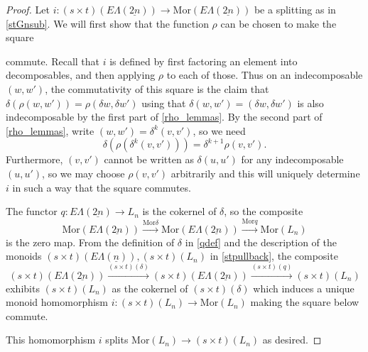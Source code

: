 \documentclass{amsbook} %
\newcommand{\ELn}{E\Lambda(\underline{n})}
\newcommand{\ELnn}{E\Lambda(\underline{2n})}
\numberwithin{section}{chapter}
\begin{document}
\begin{proof}
Let $i:(s \times t)(\ELnn) \to \mathrm{Mor}(\ELnn)$ be a splitting as in \cref{stGnsub}. We will first show that the function $\rho$ can be chosen to make the square
\begin{center}
\end{center}
commute. Recall that $i$ is defined by first factoring an element into decomposables, and then applying $\rho$ to each of those. Thus on an indecomposable $(w,w')$, the commutativity of this square is the claim that $\delta(\rho(w,w')) = \rho(\delta w, \delta w')$ using that $\delta(w,w') = (\delta w, \delta w')$ is also indecomposable by the first part of \cref{rho_lemmas}. By the second part of \cref{rho_lemmas}, write $(w,w') = \delta^k(v,v')$, so we need
\[
\delta(\rho(\delta^k(v,v'))) = \delta^{k+1}\rho(v,v').
\]
Furthermore, $(v,v')$ cannot be written as $\delta(u,u')$ for any indecomposable $(u,u')$, so we may choose $\rho(v,v')$ arbitrarily and this will uniquely determine $i$ in such a way that the square commutes. 

The functor $q:\ELnn \to L_n$ is the cokernel of $\delta$, so the composite
\[
\mathrm{Mor}(\ELnn) \stackrel{\mathrm{Mor}\delta}{\longrightarrow} \mathrm{Mor}(\ELnn) \stackrel{\mathrm{Mor}q}{\longrightarrow} \mathrm{Mor}(L_n)
\]
is the zero map. From the definition of $\delta$ in \cref{qdef} and the description of the monoids $(s \times t)(\ELn), (s \times t)(L_n)$ in \cref{stpullback}, the composite
\[
(s \times t)(\ELnn) \stackrel{(s \times t)(\delta)}{\longrightarrow}  (s \times t)(\ELnn) \stackrel{(s \times t)(q)}{\longrightarrow} (s \times t)(L_n)
\]
exhibits $(s \times t)(L_n)$ as the cokernel of $(s \times t)(\delta)$ which induces a unique monoid homomorphism $i: (s \times t)(L_n) \to \mathrm{Mor}(L_n)$ making the square below commute.
\begin{center}
\end{center}
This homomorphism $i$ splits $\mathrm{Mor}(L_n) \to (s \times t)(L_n)$ as desired.


\end{proof}
\end{document}
